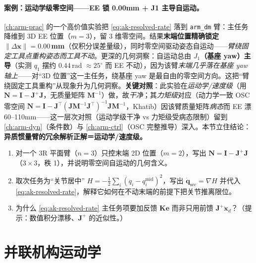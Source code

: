 \paragraph{案例：运动学级零空间——EE 锁 0.00mm + J1 主导自运动。}
\cref{ch:arm-prac} 的一个高价值实验把 \cref{eq:ak-resolved-rate} 落到 \texttt{arm\_dm} 臂：主任务降维到 3D EE 位置（$m=3$），留 3 维零空间。结果\textbf{末端位置精确锁定 $\|\Delta\mathbf{x}\|=0.00\,$mm}（仅积分误差量级），同时零空间驱动姿态自运动——\emph{臂绕固定工具点重构姿态而工具不动}。更深的几何洞察：自运动总由 \textbf{$J_1$（基座 yaw）主导}（实测 $q_1$ 摆约 $0.44\,$rad $\approx25^\circ$ 而 EE 不动），因为该臂\emph{末端几乎落在基座 yaw 轴上}——对“3D 位置”这一主任务，绕基座 yaw 是最自由的零空间方向。这把“臂绕固定工具重构”从现象升为几何洞察。\textbf{关键对照}：此实验在\emph{运动学/速度级}（用 $\mathbf{N}=\mathbf{I}-\mathbf{J}^{+}\mathbf{J}$，无质量矩阵 $\mathbf{M}^{-1}$）做，故\emph{干净}；其\emph{力矩级}对应（动力学一致 OSC 零空间 $\mathbf{N}=\mathbf{I}-\mathbf{J}^\top(\mathbf{J}\mathbf{M}^{-1}\mathbf{J}^\top)^{-1}\mathbf{J}\mathbf{M}^{-1}$，Khatib）因该臂质量矩阵\emph{病态}而 EE 漂 60--110mm——这一层次对照（运动学级干净 vs 力矩级受病态限制）留到 \cref{ch:arm-dyn}（条件数）与 \cref{ch:arm-ctrl}（OSC 完整推导）深入。本节立住结论：\textbf{异质惯量臂的冗余解析正解＝运动学/速度级。}

\begin{practice}
\begin{enumerate}
  \item 对一个 3R 平面臂（$n=3$）只控末端 2D 位置（$m=2$），写出 $\mathbf{N}=\mathbf{I}-\mathbf{J}^{+}\mathbf{J}$（$3\times3$，秩 1），并说明零空间自运动的几何含义。
  \item 取次任务为“关节居中” $H=-\tfrac12\sum_i(q_i-q_i^{\text{mid}})^2$，写出 $\dot{\mathbf{q}}_{\text{sec}}=\nabla H$ 并代入 \cref{eq:ak-resolved-rate}，解释它如何在不动末端的前提下把关节推离限位。
  \item 为什么 \cref{eq:ak-resolved-rate} 主任务项要加反馈 $\mathbf{K}\mathbf{e}$ 而非只用前馈 $\mathbf{J}^{+}\dot{\mathbf{x}}_d$？（提示：数值积分漂移、$\mathbf{J}^{+}$ 的近似性。）
\end{enumerate}
\end{practice}

\section{并联机构运动学}
\label{sec:ak-parallel}

